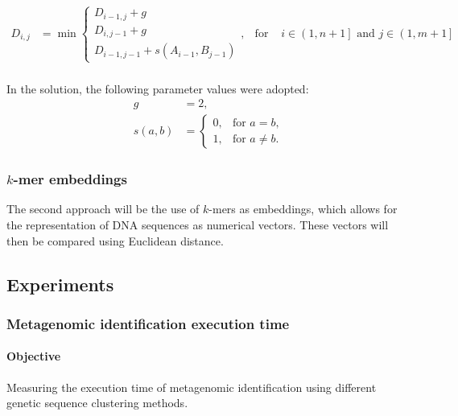 \documentclass[pdflatex,sn-vancouver-num]{sn-jnl}%
\begin{document}
                \begin{equation}
                    \begin{aligned}
                        D_{i,j} &= \min
                        \begin{cases}
                        D_{i - 1, j} + g \\
                        D_{i, j - 1} + g \\
                        D_{i - 1, j - 1} + s(A_{i - 1}, B_{j - 1})
                        \end{cases}, & \text{for } & i \in \left(1, n + 1\right] \text{ and } j \in \left(1, m + 1\right] \\
                    \end{aligned}
                    \label{Equation:NeedlemanWunschModified}
                \end{equation}

                In the solution, the following parameter values were adopted:
                \begin{align*}
                    g &= 2, \\
                    s(a, b) &= \begin{cases}
                        0, & \text{for } a = b, \\
                        1, & \text{for } a \neq b.
                    \end{cases}
                \end{align*}

            \subsubsection{$k$-mer embeddings}
                The second approach will be the use of $k$-mers as embeddings, which allows for the representation of DNA sequences as numerical vectors. These vectors will then be compared using Euclidean distance.

        \subsection{Experiments}
            \subsubsection{Metagenomic identification execution time }
                \paragraph{Objective}
                Measuring the execution time of metagenomic identification using different genetic sequence clustering methods.
\end{document}
